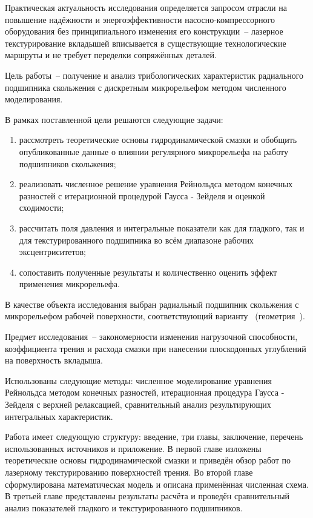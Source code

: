 Практическая актуальность исследования определяется запросом отрасли на повышение надёжности и энергоэффективности насосно-компрессорного оборудования без принципиального изменения его конструкции~-- лазерное текстурирование вкладышей вписывается в существующие технологические маршруты и не требует переделки сопряжённых деталей.

Цель работы~-- получение и анализ трибологических характеристик радиального подшипника скольжения с дискретным микрорельефом методом численного моделирования.

В рамках поставленной цели решаются следующие задачи:
\begin{enumerate}
    \item рассмотреть теоретические основы гидродинамической смазки и обобщить опубликованные данные о влиянии регулярного микрорельефа на работу подшипников скольжения;
    \item реализовать численное решение уравнения Рейнольдса методом конечных разностей с итерационной процедурой Гаусса - Зейделя и оценкой сходимости;
    \item рассчитать поля давления и интегральные показатели как для гладкого, так и для текстурированного подшипника во всём диапазоне рабочих эксцентриситетов;
    \item сопоставить полученные результаты и количественно оценить эффект применения микрорельефа.
\end{enumerate}

В качестве объекта исследования выбран радиальный подшипник скольжения с \varDimpleTypeGenitive{} микрорельефом рабочей поверхности, соответствующий варианту~\varNumber{} (геометрия~\varGeomLetter).

Предмет исследования~-- закономерности изменения нагрузочной способности, коэффициента трения и расхода смазки при нанесении плоскодонных углублений на поверхность вкладыша.

Использованы следующие методы: численное моделирование уравнения Рейнольдса методом конечных разностей, итерационная процедура Гаусса - Зейделя с верхней релаксацией, сравнительный анализ результирующих интегральных характеристик.

Работа имеет следующую структуру: введение, три главы, заключение, перечень использованных источников и приложение. В первой главе изложены теоретические основы гидродинамической смазки и приведён обзор работ по лазерному текстурированию поверхностей трения. Во второй главе сформулирована математическая модель и описана применённая численная схема. В третьей главе представлены результаты расчёта и проведён сравнительный анализ показателей гладкого и текстурированного подшипников.
